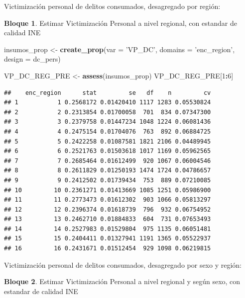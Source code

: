 \documentclass[]{book}
\newenvironment{Shaded}{\begin{snugshade}}{\end{snugshade}}
\newcommand{\DataTypeTok}[1]{\textcolor[rgb]{0.13,0.29,0.53}{#1}}
\newcommand{\DecValTok}[1]{\textcolor[rgb]{0.00,0.00,0.81}{#1}}
\newcommand{\KeywordTok}[1]{\textcolor[rgb]{0.13,0.29,0.53}{\textbf{#1}}}
\newcommand{\NormalTok}[1]{#1}
\newcommand{\OperatorTok}[1]{\textcolor[rgb]{0.81,0.36,0.00}{\textbf{#1}}}
\newcommand{\StringTok}[1]{\textcolor[rgb]{0.31,0.60,0.02}{#1}}
\theoremstyle{definition}
\theoremstyle{definition}
\newtheorem{example}{Bloque}[chapter]
\theoremstyle{definition}
\theoremstyle{definition}
\theoremstyle{remark}
\begin{document}
Victimización personal de delitos consumados, desagregado por región:

\begin{example}
\protect\hypertarget{exm:bloque12nbm}{}{\label{exm:bloque12nbm} }Estimar Victimización Personal a nivel regional, con estandar de calidad INE
\end{example}

\begin{Shaded}
\begin{Highlighting}[]
\NormalTok{insumos_prop <-}\StringTok{ }\KeywordTok{create_prop}\NormalTok{(}\DataTypeTok{var =} \StringTok{'VP_DC'}\NormalTok{, }
                                   \DataTypeTok{domains =} \StringTok{'enc_region'}\NormalTok{, }
                                   \DataTypeTok{design =}\NormalTok{  dc_pers)}

\NormalTok{VP_DC_REG_PRE <-}\StringTok{ }\KeywordTok{assess}\NormalTok{(insumos_prop)}
\NormalTok{VP_DC_REG_PRE[}\DecValTok{1}\OperatorTok{:}\DecValTok{6}\NormalTok{]}
\end{Highlighting}
\end{Shaded}

\begin{verbatim}
##    enc_region      stat         se   df    n         cv
## 1           1 0.2568172 0.01420410 1117 1283 0.05530824
## 2           2 0.2313854 0.01700058  701  834 0.07347300
## 3           3 0.2379758 0.01447234 1048 1224 0.06081436
## 4           4 0.2475154 0.01704076  763  892 0.06884725
## 5           5 0.2422258 0.01087581 1821 2106 0.04489945
## 6           6 0.2521763 0.01503618 1017 1169 0.05962565
## 7           7 0.2685464 0.01612499  920 1067 0.06004546
## 8           8 0.2611829 0.01250193 1474 1724 0.04786657
## 9           9 0.2412502 0.01739434  753  889 0.07210085
## 10         10 0.2361271 0.01413669 1085 1251 0.05986900
## 11         11 0.2773473 0.01612302  903 1066 0.05813297
## 12         12 0.2396374 0.01618739  796  932 0.06754952
## 13         13 0.2462710 0.01884833  604  731 0.07653493
## 14         14 0.2527983 0.01529804  975 1135 0.06051481
## 15         15 0.2404411 0.01327941 1191 1365 0.05522937
## 16         16 0.2431671 0.01512454  929 1098 0.06219815
\end{verbatim}

Victimización personal de delitos consumados, desagregado por sexo y región:

\begin{example}
\protect\hypertarget{exm:bloque13nbm}{}{\label{exm:bloque13nbm} }Estimar Victimización Personal a nivel regional y según sexo, con estandar de calidad INE
\end{example}
\end{document}
